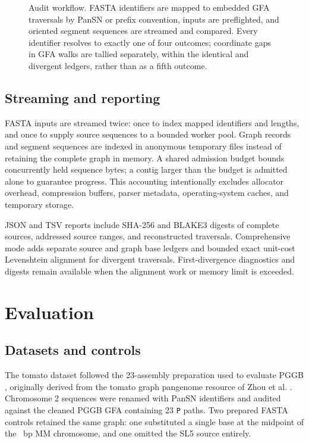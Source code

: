 \documentclass[10pt]{article}
\begin{document}
\begin{figure}[t]
\centering
\resizebox{\linewidth}{!}{}
\caption{Audit workflow. FASTA identifiers are mapped to embedded GFA
traversals by PanSN or prefix convention, inputs are preflighted, and oriented
segment sequences are streamed and compared. Every identifier resolves to
exactly one of four outcomes; coordinate gaps in GFA walks are tallied
separately, within the identical and divergent ledgers, rather than as a fifth
outcome.}
\label{fig:workflow}
\end{figure}

\subsection{Streaming and reporting}

FASTA inputs are streamed twice: once to index mapped identifiers and lengths,
and once to supply source sequences to a bounded worker pool. Graph records and
segment sequences are indexed in anonymous temporary files instead of retaining
the complete graph in memory. A shared admission budget bounds concurrently held
sequence bytes; a contig larger than the budget is admitted alone to guarantee
progress. This accounting intentionally excludes allocator overhead,
compression buffers, parser metadata, operating-system caches, and temporary
storage.

JSON and TSV reports include SHA-256 and BLAKE3 digests of complete sources,
addressed source ranges, and reconstructed traversals. Comprehensive mode adds
separate source and graph base ledgers and bounded exact unit-cost Levenshtein
alignment for divergent traversals. First-divergence diagnostics and digests
remain available when the alignment work or memory limit is exceeded.

\section{Evaluation}

\subsection{Datasets and controls}

The tomato dataset followed the 23-assembly preparation used to evaluate PGGB
\cite{garrison2024pggb}, originally derived from the tomato graph pangenome
resource of Zhou et al. \cite{zhou2022tomato}. Chromosome 2 sequences were
renamed with PanSN identifiers and audited against the cleaned PGGB GFA containing
23 \texttt{P} paths. Two prepared FASTA controls retained the same graph: one
substituted a single base at the midpoint of the
\TomatoDivergentSourceLength{}~bp MM chromosome, and one omitted the SL5 source
entirely.
\end{document}
